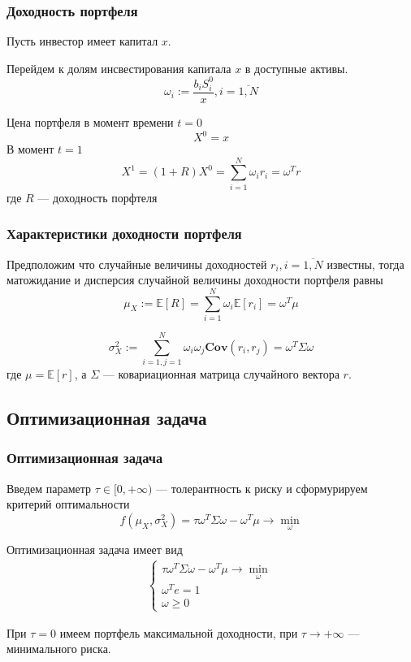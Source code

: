 \documentclass{beamer}
\newcommand{\E}[1]{\mathbb{E}\left[#1\right]} %
\newcommand{\COV}[2]{\textbf{Cov}\left(#1, #2\right)}
\begin{document}
\begin{frame}
    \frametitle{Доходность портфеля}
    Пусть инвестор имеет капитал $x$.

    Перейдем к долям инсвестирования капитала $x$ в доступные активы.
    \[
        \omega_i := \frac{b_i S_i^0}{x}, i=\overline{1, N}
    \]

    Цена портфеля в момент времени $t=0$
    \[
        X^0 = x
    \]
    В момент $t=1$
    \[
        X^1 = (1+R)X^0 = \sum_{i=1}^{N} \omega_i r_i = \omega^T r
    \]
    где $R$ --- доходность порфтеля
\end{frame}

\begin{frame}
    \frametitle{Характеристики доходности портфеля}

    Предположим что случайные величины доходностей $r_i, i=\overline{1, N}$ известны, тогда
    матожидание и дисперсия случайной величины доходности портфеля равны
    \[
        \mu_X := \E{R} = \sum_{i=1}^{N} \omega_i \E{r_i} = \omega^T \mu
    \]

    \[
        \sigma_X^2 := \sum_{i=1, j=1}^{N} \omega_i \omega_j \COV{r_i}{r_j} =
        \omega^T \Sigma \omega
    \]
    где $\mu = \E{r}$, а $\Sigma$ --- ковариационная матрица случайного вектора $r$.
\end{frame}

\subsection{Оптимизационная задача}

\begin{frame}
    \frametitle{Оптимизационная задача}
    Введем параметр $\tau \in [0, +\infty)$ --- толерантность к риску и сформурируем критерий оптимальности
    \[ 
        f(\mu_X, \sigma_X^2) = \tau \omega^T \Sigma \omega - \omega^T \mu \rightarrow \min_{\omega}
    \]

    Оптимизационная задача имеет вид
    \begin{align*}
        \begin{cases}
            \tau \omega^T \Sigma \omega - \omega^T \mu \rightarrow \min_{\omega} \\
            \omega^T e = 1 \\
            \omega \ge 0
        \end{cases}
    \end{align*}

    При $\tau=0$ имеем портфель максимальной доходности, при $\tau \rightarrow +\infty$
    --- минимального риска.
\end{frame}
\end{document}
